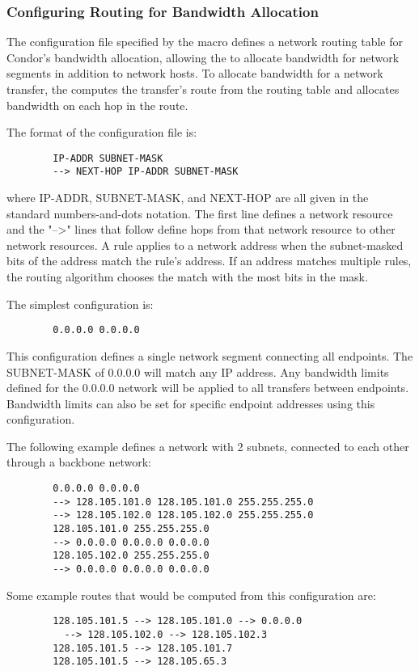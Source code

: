 \subsubsection{\label{sec:Bandwidth-Alloc-Routes}
Configuring Routing for Bandwidth Allocation}

The configuration file specified by the
 macro defines a network routing table
for Condor's bandwidth allocation, allowing the  to
allocate bandwidth for network segments in addition to network hosts.
To allocate bandwidth for a network transfer, the 
computes the transfer's route from the routing table and allocates
bandwidth on each hop in the route.

The format of the configuration file is:
\begin{verbatim}
        IP-ADDR SUBNET-MASK
        --> NEXT-HOP IP-ADDR SUBNET-MASK
\end{verbatim}
where IP-ADDR, SUBNET-MASK, and NEXT-HOP are all given in the standard
numbers-and-dots notation.  The first line defines a network resource
and the "-->" lines that follow define hops from that network resource
to other network resources.
A rule applies to a network address when the subnet-masked bits of the
address match the rule's address.
If an address matches multiple rules, the routing algorithm chooses
the match with the most bits in the mask.

The simplest configuration is:
\begin{verbatim}
        0.0.0.0 0.0.0.0
\end{verbatim}
This configuration defines a single network segment connecting all
endpoints.
The SUBNET-MASK of 0.0.0.0 will match any IP address.
Any bandwidth limits defined for the 0.0.0.0 network will be applied
to all transfers between endpoints.
Bandwidth limits can also be set for specific endpoint addresses using
this configuration.

The following example defines a network with 2 subnets, connected to
each other through a backbone network:
\begin{verbatim}
        0.0.0.0 0.0.0.0
        --> 128.105.101.0 128.105.101.0 255.255.255.0
        --> 128.105.102.0 128.105.102.0 255.255.255.0
        128.105.101.0 255.255.255.0
        --> 0.0.0.0 0.0.0.0 0.0.0.0
        128.105.102.0 255.255.255.0
        --> 0.0.0.0 0.0.0.0 0.0.0.0
\end{verbatim}
Some example routes that would be computed from this configuration
are:
\begin{verbatim}
        128.105.101.5 --> 128.105.101.0 --> 0.0.0.0
          --> 128.105.102.0 --> 128.105.102.3
        128.105.101.5 --> 128.105.101.7
        128.105.101.5 --> 128.105.65.3
\end{verbatim}

